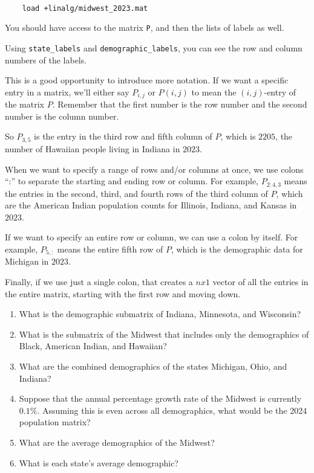 \documentclass{ximera}
\begin{document}
\begin{exploration}
\begin{example}
  \begin{verbatim}
  
    load +linalg/midwest_2023.mat

  \end{verbatim}

  You should have access to the matrix \texttt{P}, and then the lists of labels as well.

  Using \texttt{state\_labels} and \texttt{demographic\_labels}, you can see the row and column numbers of the labels.

  \begin{definition}

    This is a good opportunity to introduce more notation. If we want a specific entry in a matrix, we'll either say $P_{i,j}$ or $P(i,j)$ to mean the $(i,j)$-entry of the matrix $P$. Remember that the first number is the row number and the second number is the column number.

    So $P_{3,5}$ is the entry in the third row and fifth column of $P$, which is $2205$, the number of Hawaiian people living in Indiana in $2023$.

    When we want to specify a range of rows and/or columns at once, we use colons ``:'' to separate the starting and ending row or column. For example, $P_{2:4,3}$ means the entries in the second, third, and fourth rows of the third column of $P$, which are the American Indian population counts for Illinois, Indiana, and Kansas in $2023$.

    If we want to specify an entire row or column, we can use a colon by itself. For example, $P_{5,:}$ means the entire fifth row of $P$, which is the demographic data for Michigan in $2023$. 

    Finally, if we use just a single colon, that creates a $nx1$ vector of all the entries in the entire matrix, starting with the first row and moving down. 

  \end{definition}

\begin{enumerate}
\item What is the demographic submatrix of Indiana, Minnesota, and Wisconsin?
\item What is the submatrix of the Midwest that includes only the
  demographics of Black, American Indian, and Hawaiian?
\item What are the combined demographics of the states Michigan, Ohio,
  and Indiana?
\item Suppose that the annual percentage growth rate of the Midwest is
  currently $0.1\%$. Assuming this is even across all demographics,
  what would be the 2024 population matrix?
\item What are the average demographics of the Midwest?
\item What is each state's average demographic? 
\end{enumerate}


\end{example}
\end{exploration}
\end{document}
